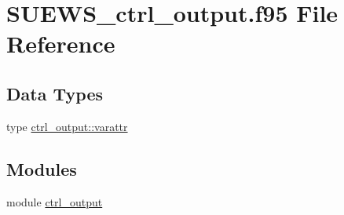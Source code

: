 \hypertarget{_s_u_e_w_s__ctrl__output_8f95}{}\section{S\+U\+E\+W\+S\+\_\+ctrl\+\_\+output.\+f95 File Reference}
\label{_s_u_e_w_s__ctrl__output_8f95}
\subsection*{Data Types}
\begin{DoxyCompactItemize}
\item 
type \hyperlink{structctrl__output_1_1varattr}{ctrl\+\_\+output\+::varattr}
\end{DoxyCompactItemize}
\subsection*{Modules}
\begin{DoxyCompactItemize}
\item 
module \hyperlink{namespacectrl__output}{ctrl\+\_\+output}
\end{DoxyCompactItemize}
